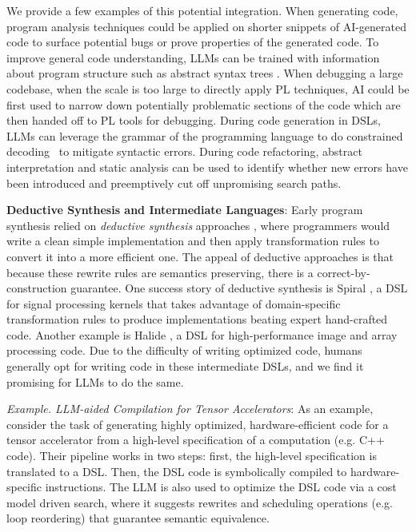 We provide a few examples of this potential integration. When generating code, program analysis techniques could be applied on shorter snippets of AI-generated code to surface potential bugs or prove properties of the generated code. To improve general code understanding, LLMs can be trained with information about program structure such as abstract syntax trees \citep{gong2024ast}. When debugging a large codebase, when the scale is too large to directly apply PL techniques, AI could be first used to narrow down potentially problematic sections of the code which are then handed off to PL tools for debugging. During code generation in DSLs, LLMs can leverage the grammar of the programming language to do constrained decoding~\citep{poesia2022synchromesh, geng2023grammar, wei2023copiloting} to mitigate syntactic errors. During code refactoring, abstract interpretation and static analysis can be used to identify whether new errors have been introduced and preemptively cut off unpromising search paths.

\textbf{Deductive Synthesis and Intermediate Languages}: Early program synthesis relied on \textit{deductive synthesis} approaches \citep{burstall1977transformation}, where programmers would write a clean simple implementation and then apply transformation rules to convert it into a more efficient one. The appeal of deductive approaches is that because these rewrite rules are semantics preserving, there is a correct-by-construction guarantee. One success story of deductive synthesis is Spiral \citep{puschel2005spiral}, a DSL for signal processing kernels that takes advantage of domain-specific transformation rules to produce implementations beating expert hand-crafted code. Another example is Halide \citep{ragan2013halide}, a DSL for high-performance image and array processing code. Due to the difficulty of writing optimized code, humans generally opt for writing code in these intermediate DSLs, and we find it promising for LLMs to do the same.

\begin{tcolorbox}[colback=lightblue, boxrule=0pt, arc=5pt, outer arc=5pt]
\textit{Example. LLM-aided Compilation for Tensor Accelerators}: As an example, \citet{hong2024llm} consider the task of generating highly optimized, hardware-efficient code for a tensor accelerator from a high-level specification of a computation (e.g. C++ code). Their pipeline works in two steps: first, the high-level specification is translated to a DSL. Then, the DSL code is symbolically compiled to hardware-specific instructions. The LLM is also used to optimize the DSL code via a cost model driven search, where it suggests rewrites and scheduling operations (e.g. loop reordering) that guarantee semantic equivalence.
\end{tcolorbox}


